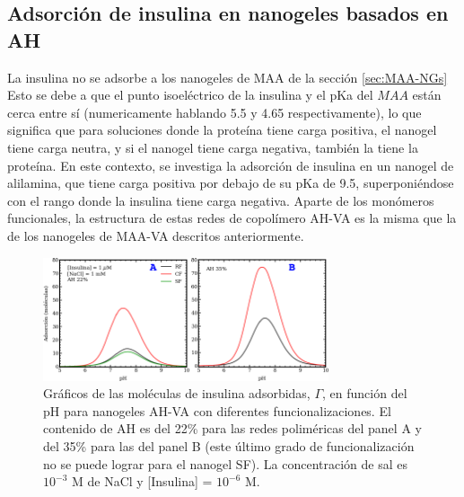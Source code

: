 \subsection{Adsorci\'on de insulina en nanogeles basados en  AH} 

La insulina no se adsorbe a los nanogeles de MAA de la secci\'on \ref{sec:MAA-NGs} %
Esto se debe a que el punto isoel\'ectrico de la insulina y el pKa del $MAA$ est\'an cerca entre s\'i (numericamente hablando 5.5 y 4.65 respectivamente), lo que significa que para soluciones donde la prote\'ina tiene carga positiva, el nanogel tiene carga neutra, y si el nanogel tiene carga negativa, tambi\'en la tiene la prote\'ina.
En este contexto, se investiga la adsorci\'on de insulina en un nanogel de alilamina, que tiene carga positiva por debajo de su pKa de 9.5, superponi\'endose con el rango donde la insulina tiene carga negativa.
Aparte de los mon\'omeros funcionales, la estructura de estas redes de copol\'imero AH-VA es la misma que la de los nanogeles de MAA-VA descritos anteriormente.


\begin{figure}[!htb]
    \centering
    \includegraphics[width=0.75\textwidth]{Figures/graphs-gel2/insu-PAH.pdf}
    \caption{Gr\'aficos de las mol\'eculas de insulina adsorbidas, $\Gamma$, en funci\'on del pH para nanogeles AH-VA con diferentes funcionalizaciones.
    	El contenido de AH es del 22\% para las redes polim\'ericas del panel A y del 35\% para las del panel B (este \'ultimo grado de funcionalización no se puede lograr para el nanogel SF).
    	 La concentraci\'on de sal es $10^{-3}$ M de NaCl y [Insulina] = $10^{-6}$ M.}
    \label{fig:esf:adsorption-vs-pH-insulin}
\end{figure}




